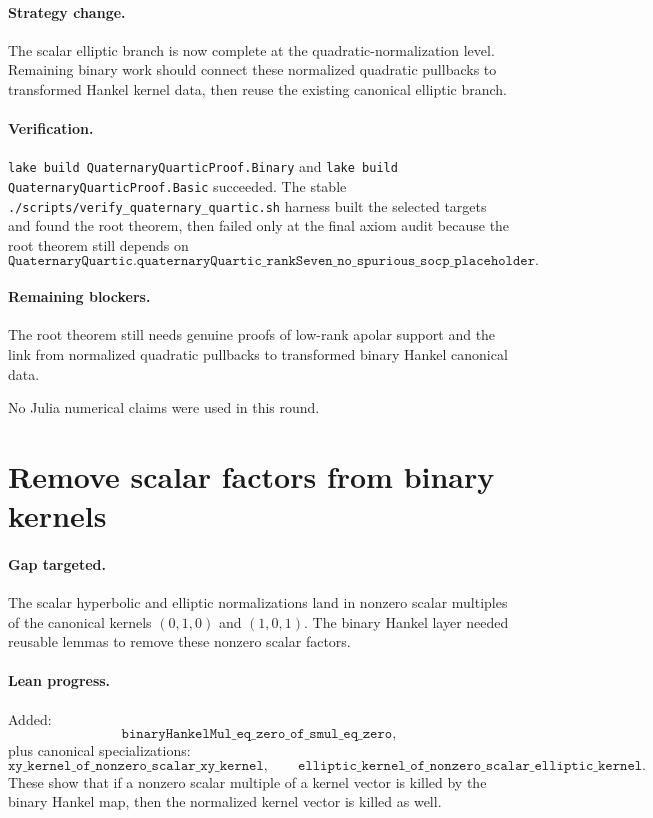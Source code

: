 \documentclass[11pt]{article}
\begin{document}
\paragraph{Strategy change.}
The scalar elliptic branch is now complete at the quadratic-normalization
level.  Remaining binary work should connect these normalized quadratic
pullbacks to transformed Hankel kernel data, then reuse the existing canonical
elliptic branch.

\paragraph{Verification.}
\texttt{lake build QuaternaryQuarticProof.Binary} and
\texttt{lake build QuaternaryQuarticProof.Basic} succeeded.  The stable
\texttt{./scripts/verify\_quaternary\_quartic.sh} harness built the selected
targets and found the root theorem, then failed only at the final axiom audit
because the root theorem still depends on
\[
\texttt{QuaternaryQuartic.quaternaryQuartic\_rankSeven\_no\_spurious\_socp\_placeholder}.
\]

\paragraph{Remaining blockers.}
The root theorem still needs genuine proofs of low-rank apolar support and the
link from normalized quadratic pullbacks to transformed binary Hankel canonical
data.

No Julia numerical claims were used in this round.

\section*{Remove scalar factors from binary kernels}

\paragraph{Gap targeted.}
The scalar hyperbolic and elliptic normalizations land in nonzero scalar
multiples of the canonical kernels \((0,1,0)\) and \((1,0,1)\).  The binary
Hankel layer needed reusable lemmas to remove these nonzero scalar factors.

\paragraph{Lean progress.}
Added:
\[
\texttt{binaryHankelMul\_eq\_zero\_of\_smul\_eq\_zero},
\]
plus canonical specializations:
\[
\texttt{xy\_kernel\_of\_nonzero\_scalar\_xy\_kernel},
\qquad
\texttt{elliptic\_kernel\_of\_nonzero\_scalar\_elliptic\_kernel}.
\]
These show that if a nonzero scalar multiple of a kernel vector is killed by
the binary Hankel map, then the normalized kernel vector is killed as well.
\end{document}
